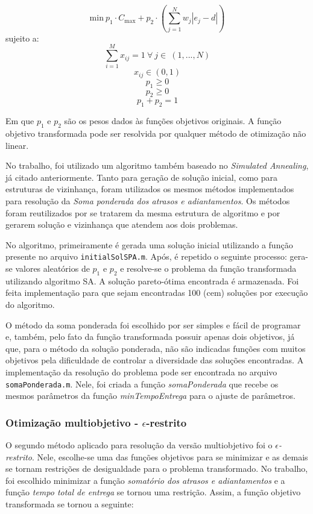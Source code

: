 \documentclass[conference]{IEEEtran}
\begin{document}
\[\mathrm{min}\ p_1 \cdot C_{\mathrm{max}} + p_2 \cdot \left( \sum_{j=1}^{N}w_j|e_j-d| \right)\]
sujeito a:
\begin{equation}
\sum_{i=1}^{M}x_{ij}=1\ \forall\ j \in\ (1,...,N)
\label{eq:rest4}
\end{equation}
\[x_{ij} \in (0, 1)\]
\[p_1 \ge 0\]
\[p_2 \ge 0\]
\[p_1 + p_2 = 1\]

Em que $p_1$ e $p_2$ são os pesos dados às funções objetivos originais. A função objetivo transformada pode ser resolvida por qualquer método de otimização não linear.

No trabalho, foi utilizado um algoritmo também baseado no \emph{Simulated Annealing}, já citado anteriormente. Tanto para geração de solução inicial, como para estruturas de vizinhança, foram utilizados os mesmos métodos implementados para resolução da \emph{Soma ponderada dos atrasos e adiantamentos}. Os métodos foram reutilizados por se tratarem da mesma estrutura de algoritmo e por gerarem solução e vizinhança que atendem aos dois problemas.

No algoritmo, primeiramente é gerada uma solução inicial utilizando a função presente no arquivo \texttt{initialSolSPA.m}. Após, é repetido o seguinte processo: gera-se valores aleatórios de $p_1$ e $p_2$ e resolve-se o problema da  função transformada utilizando algoritmo SA. A solução pareto-ótima encontrada é armazenada. Foi feita implementação para que sejam encontradas 100 (cem) soluções por execução do algoritmo.

O método da soma ponderada foi escolhido por ser simples e fácil de programar e, também, pelo fato da função transformada possuir apenas dois objetivos, já que, para o método da solução ponderada, não são indicadas funções com muitos objetivos pela dificuldade de controlar a diversidade das soluções encontradas. A implementação da resolução do problema pode ser encontrada no arquivo \texttt{somaPonderada.m}. Nele, foi criada a função \emph{somaPonderada} que recebe os mesmos parâmetros da função \emph{minTempoEntrega} para o ajuste de parâmetros.

\subsubsection{Otimização multiobjetivo - $\epsilon$-restrito}

O segundo método aplicado para resolução da versão multiobjetivo foi o \emph{$\epsilon$-restrito}. Nele, escolhe-se uma das funções objetivos para se minimizar e as demais se tornam restrições de desigualdade para o problema transformado. No trabalho, foi escolhido minimizar a função \emph{somatório dos atrasos e adiantamentos} e a função \emph{tempo total de entrega} se tornou uma restrição. Assim, a função objetivo transformada se tornou a seguinte:
\end{document}
